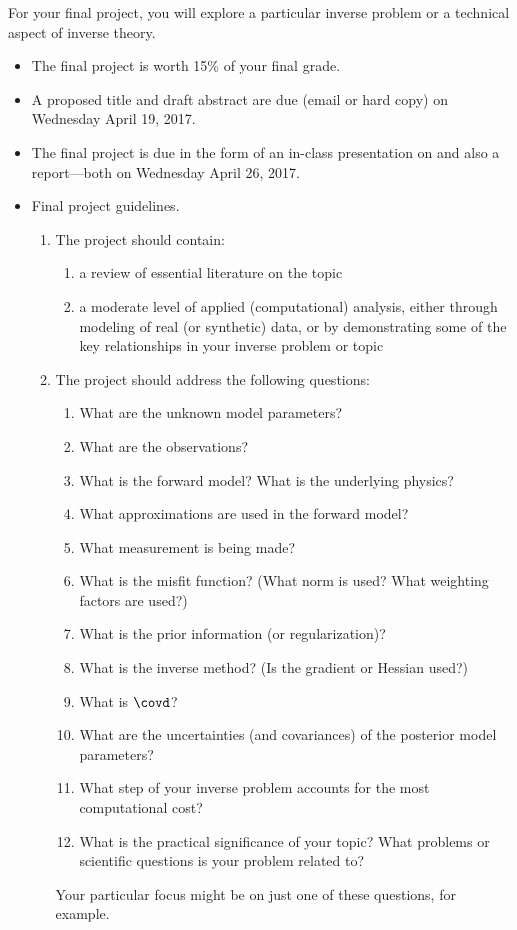 \documentclass[11pt,titlepage,fleqn]{article}
\begin{document}
For your final project, you will explore a particular inverse problem or a technical aspect of inverse theory.
%
\begin{itemize}
\item The final project is worth 15\% of your final grade.
\item A proposed title and draft abstract are due (email or hard copy) on Wednesday April 19, 2017.
\item The final project is due in the form of an in-class presentation on and also a report---both on Wednesday April 26, 2017.

\item Final project guidelines.
%
\begin{enumerate}
\item The project should contain:
%
\begin{enumerate}
\item a review of essential literature on the topic
\item a moderate level of applied (computational) analysis, either through modeling of real (or synthetic) data, or by demonstrating some of the key relationships in your inverse problem or topic
\end{enumerate}

\item The project should address the following questions:
%
\begin{enumerate}
\item What are the unknown model parameters?
\item What are the observations?
\item What is the forward model? What is the underlying physics?
\item What approximations are used in the forward model?
\item What measurement is being made?
\item What is the misfit function? (What norm is used? What weighting factors are used?)
\item What is the prior information (or regularization)?
\item What is the inverse method? (Is the gradient or Hessian used?)
\item What is $\covd$?
\item What are the uncertainties (and covariances) of the posterior model parameters?
\item What step of your inverse problem accounts for the most computational cost?
\item What is the practical significance of your topic? What problems or scientific questions is your problem related to?
\end{enumerate}
%
Your particular focus might be on just one of these questions, for example.


\end{enumerate}
\end{itemize}
\end{document}

